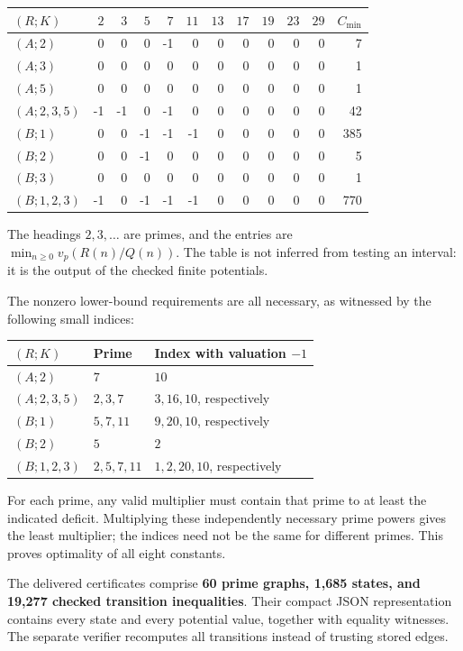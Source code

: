 \documentclass[11pt]{article}
\theoremstyle{definition}
\theoremstyle{remark}
\newcommand{\vp}{v_p}
\begin{document}
\begin{center}
\setlength{\tabcolsep}{4pt}
\small
\begin{tabular}{lrrrrrrrrrrr}
\toprule
$(R;K)$ & $2$&$3$&$5$&$7$&$11$&$13$&$17$&$19$&$23$&$29$&$C_{\min}$\\
\midrule
$(A;2)$       &0&0&0&-1&0&0&0&0&0&0&7\\
$(A;3)$       &0&0&0&0&0&0&0&0&0&0&1\\
$(A;5)$       &0&0&0&0&0&0&0&0&0&0&1\\
$(A;2,3,5)$   &-1&-1&0&-1&0&0&0&0&0&0&42\\
$(B;1)$       &0&0&-1&-1&-1&0&0&0&0&0&385\\
$(B;2)$       &0&0&-1&0&0&0&0&0&0&0&5\\
$(B;3)$       &0&0&0&0&0&0&0&0&0&0&1\\
$(B;1,2,3)$   &-1&0&-1&-1&-1&0&0&0&0&0&770\\
\bottomrule
\end{tabular}
\end{center}
The headings $2,3,\ldots$ are primes, and the entries are
$\min_{n\geq0}\vp(R(n)/Q(n))$. The table is not inferred from testing
an interval: it is the output of the checked finite potentials.

The nonzero lower-bound requirements are all necessary, as witnessed
by the following small indices:
\begin{center}
\begin{tabular}{lll}
\toprule
$(R;K)$ & Prime & Index with valuation $-1$\\
\midrule
$(A;2)$ & $7$ & $10$\\
$(A;2,3,5)$ & $2,3,7$ & $3,16,10$, respectively\\
$(B;1)$ & $5,7,11$ & $9,20,10$, respectively\\
$(B;2)$ & $5$ & $2$\\
$(B;1,2,3)$ & $2,5,7,11$ & $1,2,20,10$, respectively\\
\bottomrule
\end{tabular}
\end{center}
For each prime, any valid multiplier must contain that prime to at
least the indicated deficit. Multiplying these independently necessary
prime powers gives the least multiplier; the indices need not be the
same for different primes. This proves optimality of all eight constants.

The delivered certificates comprise \textbf{60 prime graphs, 1,685
states, and 19,277 checked transition inequalities}. Their compact JSON
representation contains every state and every potential value, together
with equality witnesses. The separate verifier recomputes all
transitions instead of trusting stored edges.
\end{document}
